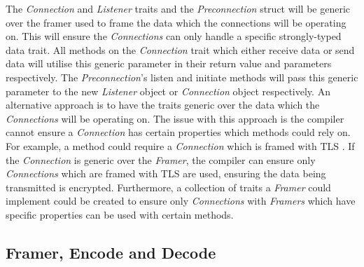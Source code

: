 \documentclass{l4proj}
\begin{document}
The \emph{Connection} and \emph{Listener} traits and the \emph{Preconnection} struct will be generic over the framer
used to frame the data which the connections will be operating on.
This will ensure the \emph{Connections} can only handle a specific strongly-typed data trait.
All methods on the \emph{Connection} trait which either receive data or send data will utilise this generic parameter in
their return value and parameters respectively.
The \emph{Preconnection}'s listen and initiate methods will pass this generic parameter to the new \emph{Listener}
object or \emph{Connection} object respectively.
An alternative approach is to have the traits generic over the data which the \emph{Connections} will be operating on.
The issue with this approach is the compiler cannot ensure a \emph{Connection} has certain properties which methods
could rely on.
For example, a method could require a \emph{Connection} which is framed with TLS .
If the \emph{Connection} is generic over the \emph{Framer}, the compiler can ensure only \emph{Connections} which are
framed with TLS are used, ensuring the data being transmitted is encrypted.
Furthermore, a collection of traits a \emph{Framer} could implement could be created to ensure only \emph{Connections}
with \emph{Framers} which have specific properties can be used with certain methods.

\subsection{Framer, Encode and Decode}\label{subsec:framer-encode-and-decode}
\end{document}
